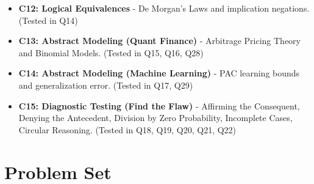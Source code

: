 \documentclass[11pt]{article}
\begin{document}
\begin{itemize}
    \item \textbf{C12: Logical Equivalences} - De Morgan's Laws and implication negations. (Tested in Q14)
    \item \textbf{C13: Abstract Modeling (Quant Finance)} - Arbitrage Pricing Theory and Binomial Models. (Tested in Q15, Q16, Q28)
    \item \textbf{C14: Abstract Modeling (Machine Learning)} - PAC learning bounds and generalization error. (Tested in Q17, Q29)
    \item \textbf{C15: Diagnostic Testing (Find the Flaw)} - Affirming the Consequent, Denying the Antecedent, Division by Zero Probability, Incomplete Cases, Circular Reasoning. (Tested in Q18, Q19, Q20, Q21, Q22)
\end{itemize}

\newpage

\section{Problem Set}
\label{sec:problems}
\end{document}
